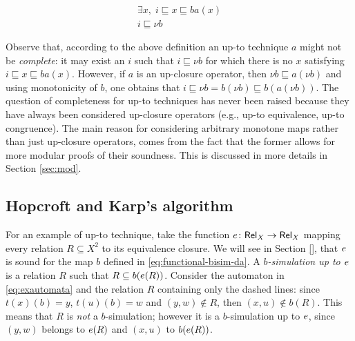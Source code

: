 \documentclass{llncs}
\begin{document}
\begin{equation}\label{eq:coinductionuptoproofprinciple}
 \begin{array}{c}
    \exists x, \; i \sqsubseteq x\sqsubseteq ba(x)\\
    \hline %
    i \sqsubseteq \nu b
\end{array}
\end{equation}

\begin{remark}\label{rmk:completenessupto}
Observe that, according to the above definition an up-to technique $a$ might not be \emph{complete}: it may exist an $i$ such that $i \sqsubseteq \nu b$ for which there is no $x$ satisfying  $i \sqsubseteq x\sqsubseteq ba(x)$. However, if $a$ is an up-closure operator, then $\nu b  \sqsubseteq a(\nu b)$ and using monotonicity of $b$, one obtains that 
$i \sqsubseteq \nu b = b(\nu b) \sqsubseteq b(a (\nu b))$. The question of completeness for up-to techniques has never been raised because they have always been considered up-closure operators (e.g., up-to equivalence, up-to congruence). The main reason for considering arbitrary monotone maps rather than just up-closure operators, comes from the fact that the former allows for more modular proofs of their soundness. This is discussed in more details in Section \ref{sec:mod}.
\end{remark}
%



\subsection{Hopcroft and Karp's algorithm}\label{ssec:HK}
For an example of  up-to technique, take the function
$e\colon \mathsf{Rel}_X \to \mathsf{Rel}_X$ mapping every relation $R\subseteq X^2$
to its equivalence closure. We will see in Section \ref{}, that $e$ is sound for the map $b$ defined in \eqref{eq:functional-bisim-da}. A \emph{$b$-simulation up to $e$} is a
relation $R$ such that $R\subseteq b (e (R))$.
Consider the automaton in \eqref{eq:exautomata} and the relation $R$
containing only the dashed lines: since $t(x)(b)=y$, $t(u)(b)=w$ and
$(y,w)\notin R$, then $(x,u)\notin b(R)$. This means that $R$ is
\emph{not} a $b$-simulation; however it is a $b$-simulation up to $e$,
since $(y,w)$ belongs to $e (R)$ and $(x,u)$ to $b(e(R))$.
\end{document}
